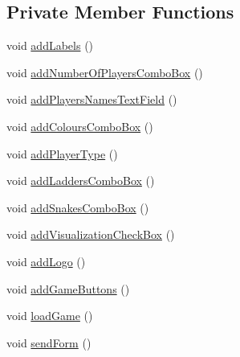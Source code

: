 \subsection*{Private Member Functions}
\begin{DoxyCompactItemize}
\item 
void \hyperlink{class_menu_1_1_menu_sn_l_a66ee14babba3fc0a603c285f4e744581}{add\+Labels} ()
\item 
void \hyperlink{class_menu_1_1_menu_sn_l_a714ff7606c361986e72e620682b0cbed}{add\+Number\+Of\+Players\+Combo\+Box} ()
\item 
void \hyperlink{class_menu_1_1_menu_sn_l_a47dfa399fdd8326a8435d2df260a65e4}{add\+Players\+Names\+Text\+Field} ()
\item 
void \hyperlink{class_menu_1_1_menu_sn_l_a295ed859c68f12de97ebfb2626cefa73}{add\+Colours\+Combo\+Box} ()
\item 
void \hyperlink{class_menu_1_1_menu_sn_l_a4558c3f6394225f5d578fdef2b0bb6c2}{add\+Player\+Type} ()
\item 
void \hyperlink{class_menu_1_1_menu_sn_l_a76f7b84bc139f5a0ef501c9ffab9097e}{add\+Ladders\+Combo\+Box} ()
\item 
void \hyperlink{class_menu_1_1_menu_sn_l_a2cb25a2dd413640047630bdb601a72f3}{add\+Snakes\+Combo\+Box} ()
\item 
void \hyperlink{class_menu_1_1_menu_sn_l_ac2ef26c4da4cc4890cc11001265ff59b}{add\+Visualization\+Check\+Box} ()
\item 
void \hyperlink{class_menu_1_1_menu_sn_l_a3f156b20b897d2757d4b8bf6ff85495f}{add\+Logo} ()
\item 
void \hyperlink{class_menu_1_1_menu_sn_l_a1a36c2b37761e10a2c22918457820e6f}{add\+Game\+Buttons} ()
\item 
void \hyperlink{class_menu_1_1_menu_sn_l_aaee495e90ef87ac55c24fe65a460a676}{load\+Game} ()
\item 
void \hyperlink{class_menu_1_1_menu_sn_l_adf112a519d7f79a6b6d3ebf3f136d8aa}{send\+Form} ()
\end{DoxyCompactItemize}
